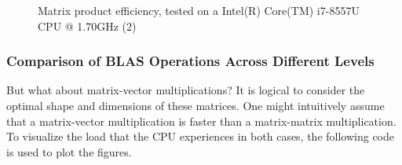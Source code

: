 \begin{figure}[h]
     \begin{center}
        
     \end{center}
     \caption{Matrix product efficiency, tested on a Intel(R) Core(TM) i7-8557U CPU @ 1.70GHz (2)}
     \label{fig:2-dotproductcomparison}
 \end{figure}

\clearpage
\newpage


\subsubsection{Comparison of BLAS Operations Across Different Levels}
But what about matrix-vector multiplications? It is logical to consider the optimal shape and dimensions of these matrices. 
One might intuitively assume that a matrix-vector multiplication is faster than a matrix-matrix multiplication.
To visualize the load that the CPU experiences in both cases, the following code is used to plot the figures.

\vspace*{0.5cm}

\begin{comment}
  
\end{comment}


